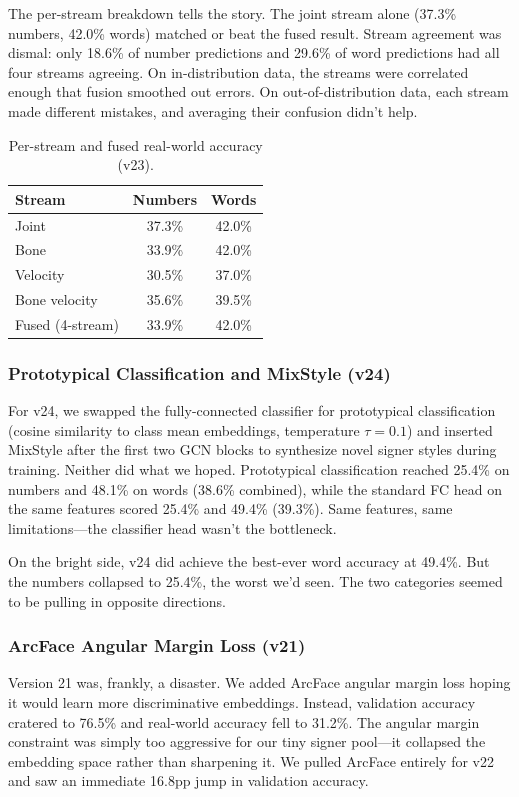 \documentclass[conference]{IEEEtran}
\begin{document}
The per-stream breakdown tells the story. The joint stream alone (37.3\% numbers, 42.0\% words) matched or beat the fused result. Stream agreement was dismal: only 18.6\% of number predictions and 29.6\% of word predictions had all four streams agreeing. On in-distribution data, the streams were correlated enough that fusion smoothed out errors. On out-of-distribution data, each stream made different mistakes, and averaging their confusion didn't help.

\begin{table}[t]
\centering
\caption{Per-stream and fused real-world accuracy (v23).}
\label{tab:multistream}
\small
\begin{tabular}{@{}lcc@{}}
\toprule
\textbf{Stream} & \textbf{Numbers} & \textbf{Words} \\
\midrule
Joint & 37.3\% & 42.0\% \\
Bone & 33.9\% & 42.0\% \\
Velocity & 30.5\% & 37.0\% \\
Bone velocity & 35.6\% & 39.5\% \\
\midrule
Fused (4-stream) & 33.9\% & 42.0\% \\
\bottomrule
\end{tabular}
\end{table}

\subsubsection{Prototypical Classification and MixStyle (v24)}
For v24, we swapped the fully-connected classifier for prototypical classification (cosine similarity to class mean embeddings, temperature $\tau = 0.1$) and inserted MixStyle after the first two GCN blocks to synthesize novel signer styles during training. Neither did what we hoped. Prototypical classification reached 25.4\% on numbers and 48.1\% on words (38.6\% combined), while the standard FC head on the same features scored 25.4\% and 49.4\% (39.3\%). Same features, same limitations---the classifier head wasn't the bottleneck.

On the bright side, v24 did achieve the best-ever word accuracy at 49.4\%. But the numbers collapsed to 25.4\%, the worst we'd seen. The two categories seemed to be pulling in opposite directions.

\subsubsection{ArcFace Angular Margin Loss (v21)}
\label{sec:arcface}
Version 21 was, frankly, a disaster. We added ArcFace angular margin loss hoping it would learn more discriminative embeddings. Instead, validation accuracy cratered to 76.5\% and real-world accuracy fell to 31.2\%. The angular margin constraint was simply too aggressive for our tiny signer pool---it collapsed the embedding space rather than sharpening it. We pulled ArcFace entirely for v22 and saw an immediate 16.8pp jump in validation accuracy.
\end{document}
